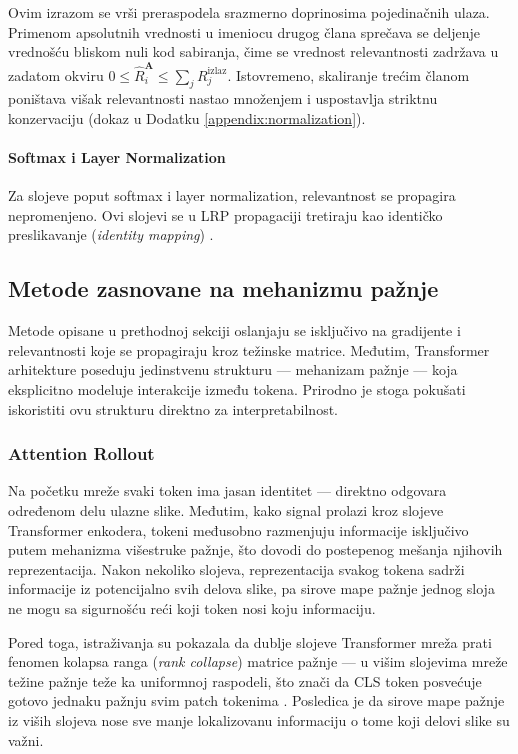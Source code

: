 Ovim izrazom se vrši preraspodela srazmerno doprinosima pojedinačnih ulaza. Primenom apsolutnih vrednosti u imeniocu drugog člana sprečava se deljenje vrednošću bliskom nuli kod sabiranja, čime se vrednost relevantnosti zadržava u zadatom okviru $0 \leq \hat{R}_i^{\mathbf{A}} \leq \sum_j R_j^{\text{izlaz}}$. Istovremeno, skaliranje trećim članom poništava višak relevantnosti nastao množenjem i uspostavlja striktnu konzervaciju (dokaz u Dodatku \ref{appendix:normalization}).

\paragraph{Softmax i Layer Normalization} Za slojeve poput softmax i layer normalization, relevantnost se propagira nepromenjeno. Ovi slojevi se u LRP propagaciji tretiraju kao identičko preslikavanje (\textit{identity mapping}) \cite{chefer2021transformer}.

\subsection{Metode zasnovane na mehanizmu pažnje}

Metode opisane u prethodnoj sekciji oslanjaju se isključivo na gradijente i 
relevantnosti koje se propagiraju kroz težinske matrice. Međutim, 
Transformer arhitekture poseduju jedinstvenu strukturu — mehanizam 
pažnje — koja eksplicitno modeluje interakcije između tokena. Prirodno je 
stoga pokušati iskoristiti ovu strukturu direktno za interpretabilnost.

\subsubsection{Attention Rollout}

Na početku mreže svaki token ima jasan identitet — direktno odgovara određenom 
delu ulazne slike. Međutim, kako signal prolazi kroz slojeve Transformer 
enkodera, tokeni međusobno razmenjuju informacije isključivo putem mehanizma 
višestruke pažnje, što dovodi do postepenog mešanja njihovih reprezentacija. 
Nakon nekoliko slojeva, reprezentacija svakog tokena sadrži informacije iz 
potencijalno svih delova slike, pa sirove mape pažnje jednog sloja ne mogu 
sa sigurnošću reći koji token nosi koju informaciju.

Pored toga, istraživanja su pokazala da dublje slojeve Transformer
mreža prati fenomen kolapsa ranga (\textit{rank collapse}) matrice pažnje — 
u višim slojevima mreže težine pažnje teže ka uniformnoj raspodeli, što znači 
da CLS token posvećuje gotovo jednaku pažnju svim patch tokenima 
\cite{dong2021attention}. Posledica je da sirove mape pažnje iz viših slojeva 
nose sve manje lokalizovanu informaciju o tome koji delovi slike su važni.

